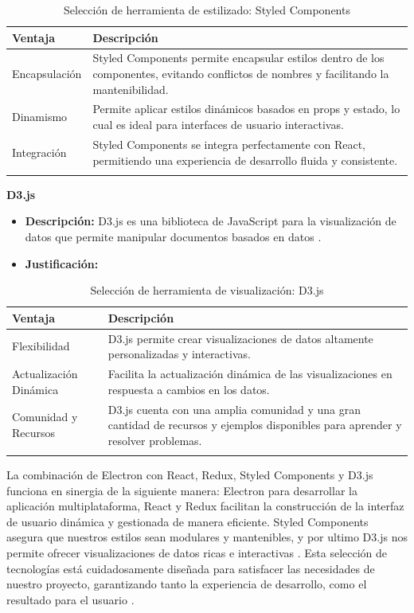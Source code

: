 \begin{longtable}{|p{3cm}|p{10cm}|}
\hline
\textbf{Ventaja} & \textbf{Descripción} \\ \hline
Encapsulación & Styled Components permite encapsular estilos dentro de los componentes, evitando conflictos de nombres y facilitando la mantenibilidad. \\ \hline
Dinamismo & Permite aplicar estilos dinámicos basados en props y estado, lo cual es ideal para interfaces de usuario interactivas. \\ \hline
Integración & Styled Components se integra perfectamente con React, permitiendo una experiencia de desarrollo fluida y consistente. \\ \hline
\caption{Selección de herramienta de estilizado: Styled Components}
\end{longtable}

\textbf{D3.js}
\begin{itemize}[label={}, leftmargin=0pt]
    \item \textbf{Descripción:} D3.js es una biblioteca de JavaScript para la visualización de datos que permite manipular documentos basados en datos \cite{d3js_website}.
    \item \textbf{Justificación:}
\end{itemize}

\begin{longtable}{|p{3cm}|p{10cm}|}
\hline
\textbf{Ventaja} & \textbf{Descripción} \\ \hline
Flexibilidad & D3.js permite crear visualizaciones de datos altamente personalizadas y interactivas. \\ \hline
Actualización Dinámica & Facilita la actualización dinámica de las visualizaciones en respuesta a cambios en los datos. \\ \hline
Comunidad y Recursos & D3.js cuenta con una amplia comunidad y una gran cantidad de recursos y ejemplos disponibles para aprender y resolver problemas. \\ \hline
\caption{Selección de herramienta de visualización: D3.js}
\end{longtable}

La combinación de Electron con React, Redux, Styled Components y D3.js funciona en sinergia de la siguiente manera: Electron para desarrollar la aplicación multiplataforma, React y Redux facilitan la construcción de la interfaz de usuario dinámica y gestionada de manera eficiente. Styled Components asegura que nuestros estilos sean modulares y mantenibles, y por ultimo D3.js nos permite ofrecer visualizaciones de datos ricas e interactivas \cite{W3CWeb}.
Esta selección de tecnologías está cuidadosamente diseñada para satisfacer las necesidades de nuestro proyecto, garantizando tanto la experiencia de desarrollo, como el resultado para el usuario \cite{HCI}. \\
